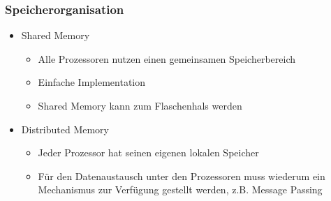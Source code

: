 \subsubsection{Speicherorganisation}
\begin{multicols}{2}
	\begin{itemize}
		\item Shared Memory
		\begin{itemize}
			\item Alle Prozessoren nutzen einen gemeinsamen Speicherbereich
			\item Einfache Implementation
			\item Shared Memory kann zum Flaschenhals werden
		\end{itemize}
	\end{itemize}
\columnbreak
	\begin{itemize}
		\item Distributed Memory
		\begin{itemize}
			\item Jeder Prozessor hat seinen eigenen lokalen Speicher
			\item Für den Datenaustausch unter den Prozessoren muss wiederum ein Mechanismus zur Verfügung gestellt werden, z.B. Message Passing
		\end{itemize}
	\end{itemize}
\end{multicols}

